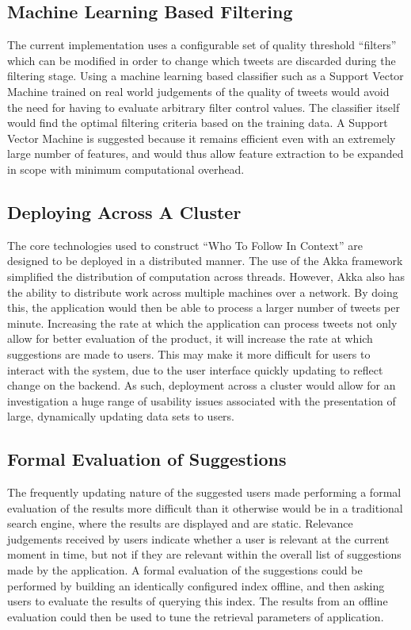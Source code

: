 \documentclass{l4proj}
\begin{document}
        \subsection{Machine Learning Based Filtering}
        The current implementation uses a configurable set of quality threshold ``filters'' which can be modified in order to change which tweets are discarded during the filtering stage. Using a machine learning based classifier such as a Support Vector Machine trained on real world judgements of the quality of tweets would avoid the need for having to evaluate arbitrary filter control values. The classifier itself would find the optimal filtering criteria based on the training data. A Support Vector Machine is suggested because it remains efficient even with an extremely large number of features, and would thus allow feature extraction to be expanded in scope with minimum computational overhead.
        
        \subsection{Deploying Across A Cluster}
        The core technologies used to construct ``Who To Follow In Context'' are designed to be deployed in a distributed manner. The use of the Akka framework simplified the distribution of computation across threads. However, Akka also has the ability to distribute work across multiple machines over a network. By doing this, the application would then be able to process a larger number of tweets per minute. Increasing the rate at which the application can process tweets not only allow for better evaluation of the product, it will increase the rate at which suggestions are made to users. This may make it more difficult for users to interact with the system, due to the user interface quickly updating to reflect change on the backend. As such, deployment across a cluster would allow for an investigation a huge range of usability issues associated with the presentation of large, dynamically updating data sets to users.
    
        \subsection{Formal Evaluation of Suggestions}
    The frequently updating nature of the suggested users made performing a formal evaluation of the results more difficult than it otherwise would be in a traditional search engine, where the results are displayed and are static. Relevance judgements received by users indicate whether a user is relevant at the current moment in time, but not if they are relevant within the overall list of suggestions made by the application. A formal evaluation of the suggestions could be performed by building an identically configured index offline, and then asking users to evaluate the results of querying this index. The results from an offline evaluation could then be used to tune the retrieval parameters of application.
    
\end{document}
